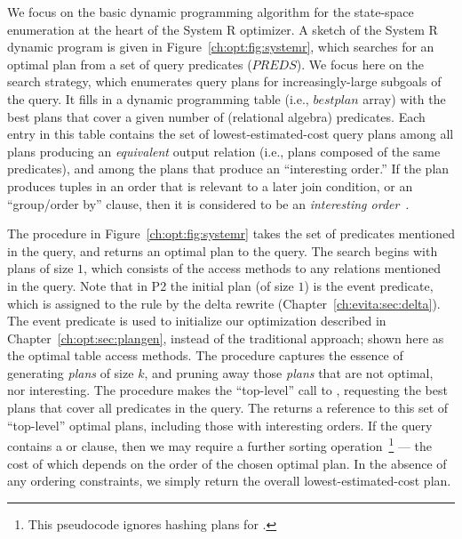 We focus on the basic dynamic programming algorithm for the state-space
enumeration at the heart of the System R optimizer.  A sketch of the System R
dynamic program is given in Figure~\ref{ch:opt:fig:systemr}, which searches for
an optimal plan from a set of query predicates ($PREDS$).  We focus here on the
search strategy, which enumerates query plans for increasingly-large subgoals
of the query.  It fills in a dynamic programming table (i.e., $bestplan$ array)
with the best plans that cover a given number of (relational algebra)
predicates.  Each entry in this table contains the set of lowest-estimated-cost
query plans among all plans producing an {\em equivalent} output relation
(i.e., plans composed of the same predicates), and among the plans that produce
an ``interesting order.'' If the plan produces tuples in an order that is
relevant to a later join condition, or an ``group/order by'' clause, then it is
considered to be an {\em interesting order}~\cite{selinger}.

The  procedure in Figure~\ref{ch:opt:fig:systemr} takes the set of
predicates mentioned in the query, and returns an optimal plan to the query.
The search begins with plans of size $1$, which consists of the access methods
to any relations mentioned in the query.  Note that in P2 the initial plan (of
size $1$) is the event predicate, which is assigned to the rule by the delta
rewrite (Chapter~\ref{ch:evita:sec:delta}).  The event predicate is used to
initialize our optimization described in Chapter~\ref{ch:opt:sec:plangen},
instead of the traditional approach; shown here as the optimal table access
methods.  The  procedure captures the essence of generating {\em
plans} of size $k$, and pruning away those {\em plans} that are not optimal,
nor interesting.  The  procedure makes the ``top-level'' call to
, requesting the best plans that cover all predicates in the query.
The  returns a reference to this set of ``top-level'' optimal plans,
including those with interesting orders.  If the query contains a 
or  clause, then we may require a further sorting
operation~\footnote{This pseudocode ignores hashing plans for .}
--- the cost of which depends on the order of the chosen optimal plan.  In the
absence of any ordering constraints, we simply return the overall
lowest-estimated-cost plan.


